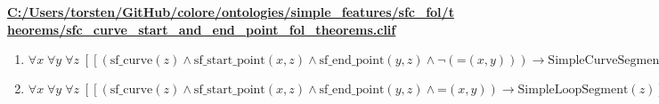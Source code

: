 \documentclass{article}
\begin{document}
\textbf{\url{C:/Users/torsten/GitHub/colore/ontologies/simple\_features/sfc\_fol/theorems/sfc\_curve\_start\_and\_end\_point\_fol\_theorems.clif}}

\begin{enumerate}
\item $\forall x\; \forall y\; \forall z\;  \left[ \left[ \left(\textrm{sf\_curve}(z) \land \textrm{sf\_start\_point}(x,z) \land \textrm{sf\_end\_point}(y,z) \land \neg \left(\textrm{=}(x,y)\right)\right) \rightarrow \textrm{SimpleCurveSegment}(z) \right] \right]$
\item $\forall x\; \forall y\; \forall z\;  \left[ \left[ \left(\textrm{sf\_curve}(z) \land \textrm{sf\_start\_point}(x,z) \land \textrm{sf\_end\_point}(y,z) \land \textrm{=}(x,y)\right) \rightarrow \textrm{SimpleLoopSegment}(z) \right] \right]$
\end{enumerate}
\end{document}
